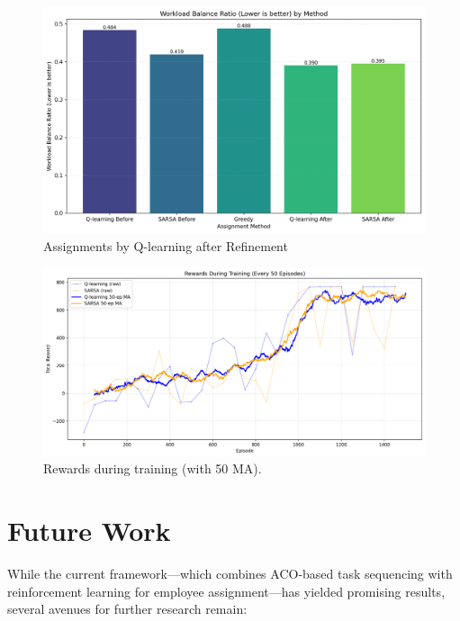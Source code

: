 \documentclass[%
aip,
cp,  %
amsmath,amssymb,
reprint,%
]{revtex4-2}
\begin{document}
	\begin{figure}[H]
		\centering
		\includegraphics[width=1\textwidth]{figures/workload_balance_ratio_comparison.png}
		\caption{\label{fig:q_learning}Assignments by Q-learning after Refinement}
	\end{figure}
	
	\begin{figure}[H]
		\centering
		\includegraphics[width=1\textwidth]{figures/rewards_history.png}
		\caption{\label{fig:rewards_training}Rewards during training (with 50 MA).}
	\end{figure}
	
	\section{\label{sec:future}Future Work}
	
	While the current framework—which combines ACO-based task sequencing with
	reinforcement learning for employee assignment—has yielded promising results, several
	avenues for further research remain:
	
\end{document}
